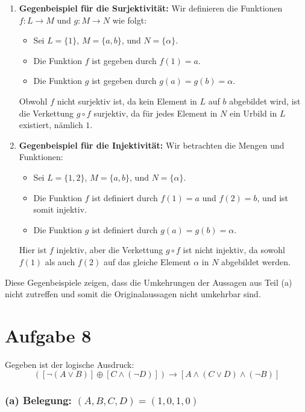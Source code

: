 \documentclass[12pt]{article}
\begin{document}
\begin{enumerate}
	\item \textbf{Gegenbeispiel für die Surjektivität:}
	      Wir definieren die Funktionen \( f : L \rightarrow M \) und \( g : M \rightarrow N \) wie folgt:
	      \begin{itemize}
		      \item Sei \( L = \{1\} \), \( M = \{a, b\} \), und \( N = \{\alpha\} \).
		      \item Die Funktion \( f \) ist gegeben durch \( f(1) = a \).
		      \item Die Funktion \( g \) ist gegeben durch \( g(a) = g(b) = \alpha \).
	      \end{itemize}
	      Obwohl \( f \) nicht surjektiv ist, da kein Element in \( L \) auf \( b \) abgebildet wird, ist die Verkettung \( g \circ f \) surjektiv, da für jedes Element in \( N \) ein Urbild in \( L \) existiert, nämlich \( 1 \).

	\item \textbf{Gegenbeispiel für die Injektivität:}
	      Wir betrachten die Mengen und Funktionen:
	      \begin{itemize}
		      \item Sei \( L = \{1, 2\} \), \( M = \{a, b\} \), und \( N = \{\alpha\} \).
		      \item Die Funktion \( f \) ist definiert durch \( f(1) = a \) und \( f(2) = b \), und ist somit injektiv.
		      \item Die Funktion \( g \) ist definiert durch \( g(a) = g(b) = \alpha \).
	      \end{itemize}
	      Hier ist \( f \) injektiv, aber die Verkettung \( g \circ f \) ist nicht injektiv, da sowohl \( f(1) \) als auch \( f(2) \) auf das gleiche Element \( \alpha \) in \( N \) abgebildet werden.
\end{enumerate}

Diese Gegenbeispiele zeigen, dass die Umkehrungen der Aussagen aus Teil (a) nicht zutreffen und somit die Originalaussagen nicht umkehrbar sind.

\section*{Aufgabe 8}

Gegeben ist der logische Ausdruck:
\[
	([ \neg (A \lor B)] \oplus [C \land ( \neg D)]) \rightarrow [A \land(C \lor D) \land ( \neg B)]
\]

\subsubsection*{(a) Belegung: \( (A,B,C,D) = (1,0,1,0) \)}
\end{document}
